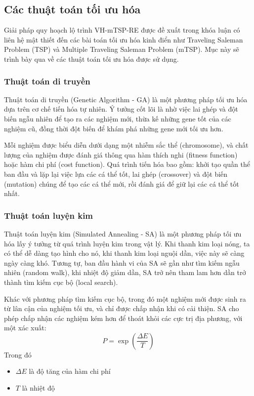 \documentclass[a4paper]{article}
\begin{document}
\subsection{Các thuật toán tối ưu hóa}

Giải pháp quy hoạch lộ trình VH-mTSP-RE được đề xuất trong khóa luận có liên hệ mật thiết đến các bài toán tối ưu hóa kinh điển như Traveling Saleman Problem (TSP) và Multiple Traveling Saleman Problem (mTSP). Mục này sẽ trình bày qua về các thuật toán tối ưu hóa được sử dụng.

\subsubsection{Thuật toán di truyền}
Thuật toán di truyền (Genetic Algorithm - GA) là một phương pháp tối ưu hóa dựa trên cơ chế tiến hóa tự nhiên. Ý tưởng cốt lõi là nhờ việc lai ghép và đột biến ngẫu nhiên để tạo ra các nghiệm mới, thừa kế những gene tốt của các nghiệm cũ, đồng thời đột biến để khám phá những gene mới tối ưu hơn.

Mỗi nghiệm được biểu diễn dưới dạng một nhiễm sắc thể (chromosome), và chất lượng của nghiệm được đánh giá thông qua hàm thích nghi (fitness function) hoặc hàm chi phí (cost function). Quá trình tiến hóa bao gồm: khởi tạo quần thể ban đầu và lặp lại việc lựa các cá thể tốt, lai ghép (crossover) và đột biến (mutation) chúng để tạo các cá thể mới, rồi đánh giá để giữ lại các cá thể tốt nhất.

\subsubsection{Thuật toán luyện kim}
Thuật toán luyện kim (Simulated Annealing - SA) là một phương pháp tối ưu hóa lấy ý tưởng từ quá trình luyện kim trong vật lý. 
Khi thanh kim loại nóng, ta có thể dễ dàng tạo hình cho nó, khi thanh kim loại nguội dần, việc này sẽ càng ngày càng khó. 
Tương tự, ban đầu hành vi của SA sẽ gần như tìm kiếm ngẫu nhiên (random walk), khi nhiệt độ giảm dần, SA trở nên tham lam hơn dần trở thành tìm kiếm cục bộ (local search).

Khác với phương pháp tìm kiếm cục bộ, trong đó một nghiệm mới được sinh ra từ lân cận của nghiệm tối ưu, và chỉ được chấp nhận khi có cải thiện. SA cho phép chấp nhận các nghiệm kém hơn để thoát khỏi các cực trị địa phương, với một xác xuất:
\begin{equation}
  P = \exp(\frac{\Delta E}{T})
\end{equation}
Trong đó 
\begin{itemize}
  \item $\Delta E$ là độ tăng của hàm chi phí
  \item $T$ là nhiệt độ
\end{itemize}
\end{document}
